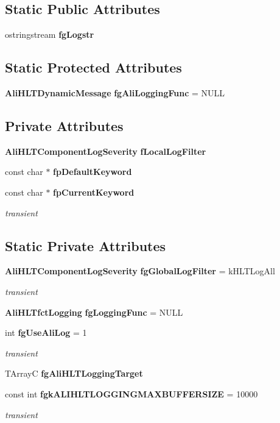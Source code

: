 \subsection*{Static Public Attributes}
\begin{CompactItemize}
\item 
ostringstream {\bf fg\-Logstr}
\end{CompactItemize}
\subsection*{Static Protected Attributes}
\begin{CompactItemize}
\item 
{\bf Ali\-HLTDynamic\-Message} {\bf fg\-Ali\-Logging\-Func} = NULL
\end{CompactItemize}
\subsection*{Private Attributes}
\begin{CompactItemize}
\item 
{\bf Ali\-HLTComponent\-Log\-Severity} {\bf f\-Local\-Log\-Filter}
\item 
const char $\ast$ {\bf fp\-Default\-Keyword}
\item 
const char $\ast$ {\bf fp\-Current\-Keyword}
\begin{CompactList}\small\item\em transient \item\end{CompactList}\end{CompactItemize}
\subsection*{Static Private Attributes}
\begin{CompactItemize}
\item 
{\bf Ali\-HLTComponent\-Log\-Severity} {\bf fg\-Global\-Log\-Filter} = k\-HLTLog\-All
\begin{CompactList}\small\item\em transient \item\end{CompactList}\item 
{\bf Ali\-HLTfct\-Logging} {\bf fg\-Logging\-Func} = NULL
\item 
int {\bf fg\-Use\-Ali\-Log} = 1
\begin{CompactList}\small\item\em transient \item\end{CompactList}\item 
TArray\-C {\bf fg\-Ali\-HLTLogging\-Target}
\item 
const int {\bf fgk\-ALIHLTLOGGINGMAXBUFFERSIZE} = 10000
\begin{CompactList}\small\item\em transient \item\end{CompactList}\end{CompactItemize}


